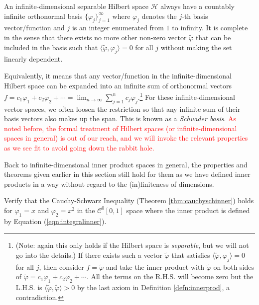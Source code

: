 \begin{proper}
\label{proper:hilbertorthosys}
An infinite-dimensional separable Hilbert space $\mathcal{H}$ always have a countably infinite orthonormal basis $\{\varphi_j\}_{j=1}^{\infty}$ where $\varphi_j$ denotes the $j$-th basis vector/function and $j$ is an integer enumerated from $1$ to infinity. It is complete in the sense that there exists no more other non-zero vector $\tilde{\varphi}$ that can be included in the basis such that $\langle \tilde{\varphi}, \varphi_j \rangle = 0$ for all $j$ without making the set linearly dependent.
\end{proper}
Equivalently, it means that any vector/function in the infinite-dimensional Hilbert space can be expanded into an infinite sum of orthonormal vectors $f = c_1\varphi_1 + c_2\varphi_2 + \cdots = \lim_{n \to \infty} \sum_{j=1}^{n} c_j \varphi_j$.\footnote{(Note: again this only holds if the Hilbert space is \textit{separable}, but we will not go into the details.) If there exists such a vector $\tilde{\varphi}$ that satisfies $\langle \tilde{\varphi}, \varphi_j \rangle = 0$ for all $j$, then consider $f = \tilde{\varphi}$ and take the inner product with $\tilde{\varphi}$ on both sides of $\tilde{\varphi} = c_1\varphi_1 + c_2\varphi_2 + \cdots$. All the terms on the R.H.S. will become zero but the L.H.S. is $\langle \tilde{\varphi}, \tilde{\varphi} \rangle > 0$ by the last axiom in Definition \ref{defn:innerprod}, a contradiction.} For these infinite-dimensional vector spaces, we often loosen the restriction so that any infinite sum of their basis vectors also makes up the span. This is known as a \textit{Schuader basis}. \textcolor{red}{As noted before, the formal treatment of Hilbert spaces (or infinite-dimensional spaces in general) is out of our reach, and we will invoke the relevant properties as we see fit to avoid going down the rabbit hole.}\par
Back to infinite-dimensional inner product spaces in general, the properties and theorems given earlier in this section still hold for them as we have defined inner products in a way without regard to the (in)finiteness of dimensions.
\begin{exmp}
Verify that the Cauchy-Schwarz Inequality (Theorem \ref{thm:cauchyschinner}) holds for $\varphi_1 = x$ and $\varphi_2 = x^2$ in the $\mathcal{C}^0[0,1]$ space where the inner product is defined by Equation (\ref{eqn:integralinner}).
\end{exmp}
